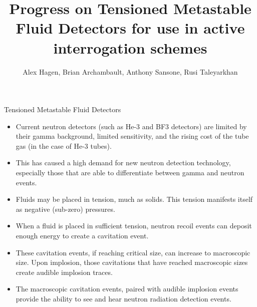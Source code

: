 

\title{Progress on Tensioned Metastable Fluid Detectors for use in active
       interrogation schemes}
\author{Alex Hagen, Brian Archambault,
        Anthony Sansone, Rusi Taleyarkhan}
\renewcommand{\today}{July 3, 2016}
\maketitle%
\hspace*{-1cm}%
\begin{pucol}{7}{12}
\def\numheadings{2}
\begin{pucell}{7}{6}{Tensioned Metastable Fluid Detectors}{}
    \begin{pucol}{4}{6}
    \begin{pucell}{4}{3}{}{}
        \begin{itemize}
            \item Current neutron detectors (such as He-3 and BF3 detectors) are limited by their gamma background, limited sensitivity, and the rising cost of the tube gas (in the case of He-3 tubes).
            \item This has caused a high demand for new neutron detection technology, especially those that are able to differentiate between gamma and neutron events.
            \item Fluids may be placed in tension, much as solids. This tension manifests itself as negative (sub-zero) pressures.
            \item When a fluid is placed in sufficient tension, neutron recoil events can deposit enough energy to create a cavitation event.
            \item These cavitation events, if reaching critical size, can increase to macroscopic size. Upon implosion, those cavitations that have reached macroscopic sizes create audible implosion traces.
            \item The macroscopic cavitation events, paired with audible implosion events provide the ability to see and hear neutron radiation detection events.
        \end{itemize}
    \end{pucell} \\
    \vspace*{-1.25in}
    \begin{pucell}{4}{3}{}{}

\end{pucell}
\end{pucol}
\end{pucell}
\end{pucol}
